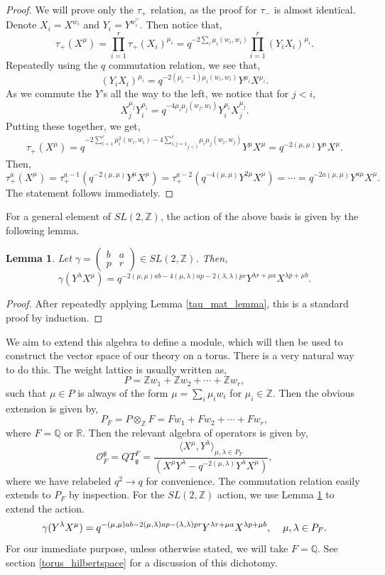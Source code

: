\documentclass{article}
\newcommand{\Z}{{\mathbb Z}}
\newtheorem{lemma}[theorem]{Lemma}
\numberwithin{corollary}{theorem}
\numberwithin{corollary}{proposition}
\begin{document}
\begin{proof}
    We will prove only the $\tau_+$ relation, as the proof for $\tau_{-}$ is almost identical. Denote $X_i = X^{w_i}$ and $Y_i = Y^{w_i^\vee}$. Then notice that,
$$\tau_+(X^\mu) = \prod^r_{i=1}\tau_+(X_i)^{\mu_i} = q^{-2\sum_i \mu_i(w_i,w_i)} \prod^r_{i=1}(Y_i X_i)^{\mu_i}.$$
Repeatedly using the $q$ commutation relation, we see that, 
$$(Y_i X_i)^{\mu_i} = q^{-2(\mu_i-1)\mu_i (w_i,w_i)}Y^{\mu_i}X^{\mu_i}.$$
As we commute the $Y$'s all the way to the left, we notice that for $j<i$,
$$X^{\mu_j}_jY^{\mu_i}_{i} = q^{-4\mu_i \mu_j (w_j,w_i)}Y^{\mu_i}_{i} X^{\mu_j}_j.$$
Putting these together, we get,
\begin{align*}
 \tau_+(X^\mu) = q^{-2 \sum^r_{i=1} \mu_i^2 (w_i,w_i) -4 \underset{j<i}{\sum^r_{i,j=1}} \mu_i\mu_j (w_i,w_j)}Y^\mu X^\mu  = q^{ -2(\mu,\mu)}Y^\mu X^\mu . 
\end{align*}
Then, 
$$\tau_+^a(X^\mu) = \tau^{a-1}_+(q^{-2(\mu,\mu)}Y^\mu X^\mu ) = \tau^{a-2}_+(q^{-4(\mu,\mu)}Y^{2\mu} X^\mu ) = \cdots =q^{-2a(\mu,\mu)}Y^{a\mu} X^\mu .$$
The statement follows immediately.
\end{proof}
For a general element of $SL(2,\Z)$, the action of the above basis is given by the following lemma.
\begin{lemma}\label{sl2z_act_lemma}
    Let $\gamma = \begin{pmatrix}
        b&a\\
        p&r
    \end{pmatrix} \in SL(2,\mathbb{Z})$. Then,
    $$\gamma(Y^\lambda X^\mu) = q^{-2(\mu,\mu)ab -4 (\mu,\lambda)ap -2(\lambda,\lambda)pr} Y^{\lambda r+\mu a } X^{\lambda p + \mu b}.$$    
\end{lemma}
\begin{proof}
    After repeatedly applying Lemma \ref{tau_mat_lemma}, this is a standard proof by induction.
\end{proof}

We aim to extend this algebra to define a module, which will then be used to construct the vector space of our theory on a torus. There is a very natural way to do this. The weight lattice is usually written as,
$$P = \mathbb{Z}w_1 + \mathbb{Z}w_2 +\cdots +\mathbb{Z}w_r,$$
such that $\mu \in P$ is always of the form $\mu = \sum_i \mu_i w_i$ for $\mu_i \in \mathbb{Z}$. Then the obvious extension is given by,
$$P_F = P\otimes_\mathbb{Z}F = Fw_1 + Fw_2 +\cdots +Fw_r,$$
where $F=\mathbb{Q}$ or $\mathbb{R}$. Then the relevant algebra of operators is given by,
$$\boxed{\mathcal{O}^\mathfrak{g}_{F} = QT^{F}_\mathfrak{g} = \frac{\langle X^\mu ,Y^\lambda\rangle_{\mu,\lambda\in P_F}}{(X^\mu Y^\lambda - q^{-2(\mu,\lambda)} Y^\lambda X^\mu)},}$$
where we have relabeled $q^2\rightarrow q$ for convenience. The commutation relation easily extends to $P_F$ by inspection. For the $SL(2,\mathbb{Z})$ action, we use Lemma \ref{sl2z_act_lemma} to extend the action.
$$\gamma(Y^\lambda X^\mu) = q^{-(\mu,\mu)ab -2 (\mu,\lambda)ap -(\lambda,\lambda)pr} Y^{\lambda r+\mu a } X^{\lambda p + \mu b}, \hspace{4mm} \mu,\lambda \in P_F.$$
For our immediate purpose, unless otherwise stated, we will take $F=\mathbb{Q}$. See section \ref{torus_hilbertspace} for a discussion of this dichotomy. 
\end{document}
